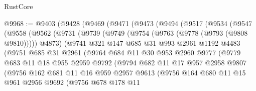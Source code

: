 \begin{lexlean}{RustCore}
\begin{coremodule}
@9968 := @9403
    (@9428
      (@9469
        (@9471
          (@9473
            (@9494
              (@9517
                (@9534
                  (@9547
                    (@9558
                      (@9562
                        (@9731
                          (@9739
                            (@9749 (@9754 (@9763 (@9778 (@9793 (@9808 @9810))))) @4873)
                            (@9741
                              @321
                              @147
                              @685
                              @31
                              @993
                              @2961
                              @1192
                              @4483
                              (@9751
                                @685
                                @31
                                @2961
                                (@9764
                                  @684
                                  @11
                                  @30
                                  @953
                                  @2960
                                  @9777
                                  (@9779
                                    @683
                                    @11
                                    @18
                                    @955
                                    @2959
                                    @9792
                                    (@9794
                                      @682
                                      @11
                                      @17
                                      @957
                                      @2958
                                      @9807
                                      (@9756
                                        @162
                                        @681
                                        @11
                                        @16
                                        @959
                                        @2957
                                        @9613
                                        (@9756
                                          @164
                                          @680
                                          @11
                                          @15
                                          @961
                                          @2956
                                          @9692
                                          (@9756
                                            @678
                                            @178
                                            @11

\end{coremodule}
\end{lexlean}

